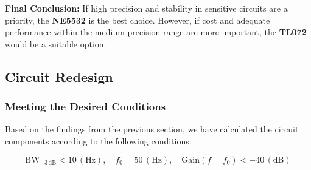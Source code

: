 \documentclass[hidelinks,12pt]{article}
\begin{document}
	\textbf{Final Conclusion:} If high precision and stability in sensitive circuits are a priority, the \textbf{NE5532} is the best choice. However, if cost and adequate performance within the medium precision range are more important, the \textbf{TL072} would be a suitable option.
	
	\pagebreak
	
	\subsection{Circuit Redesign}

	\subsubsection{Meeting the Desired Conditions}
	Based on the findings from the previous section, we have calculated the circuit components according to the following conditions:

	\[
	\text{BW}_{-3 \, \text{dB}} < 10 \, (\text{Hz}), \quad f_0 = 50 \, (\text{Hz}), \quad \text{Gain}(f = f_0) < -40 \, (\text{dB})
	\]
\end{document}
